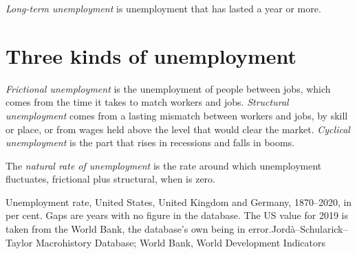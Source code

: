 \begin{definition}\label{def:g11:unemployment:long-term}
\emph{Long-term unemployment} is unemployment that has lasted a year or more.
\end{definition}

\section{Three kinds of unemployment}\label{sec:g11:unemployment:kinds}

\begin{definition}\label{def:g11:unemployment:frictional}
\emph{Frictional unemployment} is the unemployment of people between jobs, which comes from the time it takes to match workers and jobs.
\emph{Structural unemployment}\label{def:g11:unemployment:structural} comes from a lasting mismatch between workers and
jobs, by skill or place, or from wages held above the level that would clear the market. \emph{Cyclical unemployment}%
\label{def:g11:unemployment:cyclical} is the part that rises in recessions and falls in booms.
\end{definition}

\begin{definition}\label{def:g11:unemployment:natural-rate}
The \emph{natural rate of unemployment} is the rate around which unemployment fluctuates, frictional plus structural, when  is zero.
\end{definition}

\begin{omchart}{Unemployment rate, United States, United Kingdom and Germany, 1870--2020, in per cent. Gaps are years with no figure in the database. The US value for 2019
is taken from the World Bank, the database's own being in error.}{Jordà--Schularick--Taylor Macrohistory Database; World Bank, World Development Indicators}
\end{omchart}

